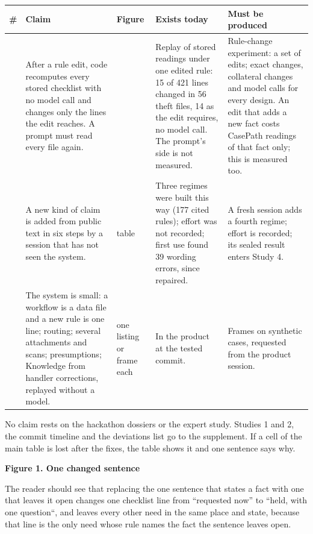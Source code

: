 \documentclass[10pt]{article}
\newenvironment{claimpage}{}{}
\newcommand{\sect}[1]{\needspace{5\baselineskip}\vspace{3pt}{\bfseries #1\par}\vspace{1pt}}
\begin{document}
\begin{claimpage}
\sect{Question 3. What does an organisation gain when its rules change, or when it adds a kind of claim?}
\begin{tabularx}{\linewidth}{>{\raggedright\arraybackslash}p{0.8em}>{\hsize=0.95\hsize\raggedright\arraybackslash}X>{\raggedright\arraybackslash}p{4.2em}>{\hsize=1.25\hsize\raggedright\arraybackslash}X>{\hsize=0.8\hsize\raggedright\arraybackslash}X}\toprule
\textbf{\#} & \textbf{Claim} & \textbf{Figure} & \textbf{Exists today} & \textbf{Must be produced}\\\midrule
6 & After a rule edit, code recomputes every stored checklist with no model call and changes only the lines the edit reaches. A prompt must read every file again. & 6 & Replay of stored readings under one edited rule: 15 of 421 lines changed in 56 theft files, 14 as the edit requires, no model call. The prompt's side is not measured. & Rule-change experiment: a set of edits; exact changes, collateral changes and model calls for every design. An edit that adds a new fact costs CasePath readings of that fact only; this is measured too.\\
7 & A new kind of claim is added from public text in six steps by a session that has not seen the system. & table & Three regimes were built this way (177 cited rules); effort was not recorded; first use found 39 wording errors, since repaired. & A fresh session adds a fourth regime; effort is recorded; its sealed result enters Study 4.\\
8 & The system is small: a workflow is a data file and a new rule is one line; routing; several attachments and scans; presumptions; Knowledge from handler corrections, replayed without a model. & one listing or frame each & In the product at the tested commit. & Frames on synthetic cases, requested from the product session.\\
\bottomrule\end{tabularx}

\sect{What the paper does not claim}
No claim rests on the hackathon dossiers or the expert study. Studies 1 and 2, the commit timeline and the deviations list go to the supplement. If a cell of the main table is lost after the fixes, the table shows it and one sentence says why.

\end{claimpage}\clearpage\restoregeometry
{\large\bfseries Figure 1. One changed sentence\par}\vspace{6pt}
{\small The reader should see that replacing the one sentence that states a fact with one that leaves it open changes one checklist line from “requested now” to “held, with one question“, and leaves every other need in the same place and state, because that line is the only need whose rule names the fact the sentence leaves open.\par}\vspace{8pt}
\end{document}
